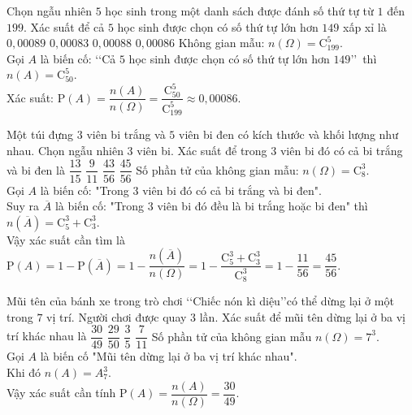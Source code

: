 \begin{ex}%
	Chọn ngẫu nhiên $5$ học sinh trong một danh sách được đánh số thứ tự từ $1$ đến $199$. Xác suất để cả $5$ học sinh được chọn có số thứ tự lớn hơn $149$ xấp xỉ là
	\choice
	{$0{,}00089$}
	{$0{,}00083$}
	{$0{,}00088$}
	{\True $0{,}00086$}
	\loigiai
	{
		Không gian mẫu: $n(\Omega)=\mathrm{C}^5_{199}$.\\
		Gọi $A$ là biến cố: \lq\lq Cả $5$ học sinh được chọn có số thứ tự lớn hơn $149$\rq\rq \, thì $n(A)=\mathrm{C}^5_{50}$.\\
		Xác suất: $\mathrm{P}(A)=\dfrac{n(A)}{n(\Omega)} =\dfrac{\mathrm{C}^5_{50}}{\mathrm{C}^5_{199}}\approx 0{,}00086$.			
	}	
\end{ex}
\begin{ex}%
	Một túi đựng $3$ viên bi trắng và $5$ viên bi đen có kích thước và khối lượng như nhau. Chọn ngẫu nhiên $3$ viên bi. Xác suất để trong $3$ viên bi đó có cả bi trắng và bi đen là
	\choice
	{$\dfrac{13}{15}$}
	{$\dfrac{9}{11}$}
	{$\dfrac{43}{56}$}
	{\True $\dfrac{45}{56}$}
	\loigiai
	{
		Số phần tử của không gian mẫu: $n(\Omega)=\mathrm{C}^3_{8}$.\\
		Gọi $A$ là biến cố: "Trong $3$ viên bi đó có cả bi trắng và bi đen".\\
		Suy ra $\overline{A}$ là biến cố: "Trong $3$ viên bi đó đều là bi trắng hoặc bi đen" thì $n(\overline{A})=\mathrm{C}^3_{5}+\mathrm{C}^3_{3}$.\\
		Vậy xác suất cần tìm là $\mathrm{P}(A)=1-\mathrm{P}(\overline{A})=1-\dfrac{n\left(\overline{A}\right)}{n(\Omega)}=1-\dfrac{\mathrm{C}^3_{5}+\mathrm{C}^3_{3}}{\mathrm{C}^3_{8}}=1-\dfrac{11}{56}=\dfrac{45}{56}$.
	}	
\end{ex}
\begin{ex}%
	Mũi tên của bánh xe trong trò chơi \lq\lq Chiếc nón kì diệu\rq\rq có thể dừng lại ở một trong $7$ vị trí. Người chơi được quay $3$ lần. Xác suất để mũi tên dừng lại ở ba vị trí khác nhau là
	\choice
	{\True $\dfrac{30}{49}$}
	{$\dfrac{29}{50}$}
	{$\dfrac{3}{5}$}
	{$\dfrac{7}{11}$}
	\loigiai
	{
		Số phần tử của không gian mẫu $n(\Omega)=7^3$.\\
		Gọi  $A$ là biến cố "Mũi tên dừng lại ở ba vị trí khác nhau".\\
		Khi đó $n(A)=A_{7}^{3}$.\\
		Vậy xác suất cần tính $ \mathrm{P}(A)=\dfrac{n(A)}{n(\Omega)}=\dfrac{30}{49}$. 		
	}	
\end{ex}
